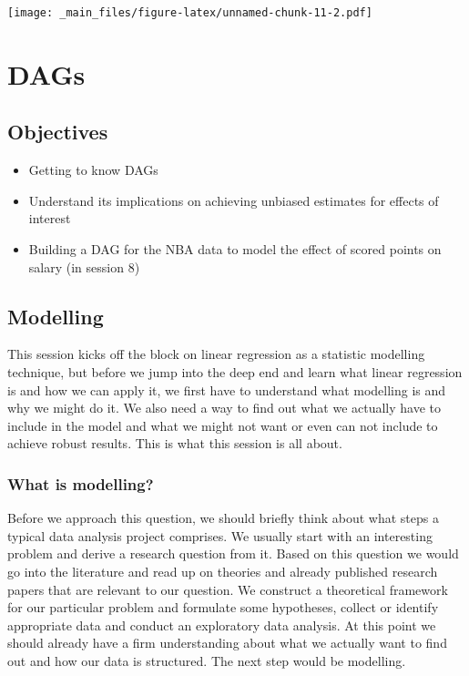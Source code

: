 \documentclass[
]{book}
\providecommand{\tightlist}{%
  \setlength{\itemsep}{0pt}\setlength{\parskip}{0pt}}
\begin{document}
\texttt{[image: \_main\_files/figure-latex/unnamed-chunk-11-2.pdf]}

\hypertarget{dags-1}{%
\chapter{DAGs}\label{dags-1}}

\hypertarget{objectives-2}{%
\section{Objectives}\label{objectives-2}}

\begin{itemize}
\tightlist
\item
  Getting to know DAGs
\item
  Understand its implications on achieving unbiased estimates for effects of interest
\item
  Building a DAG for the NBA data to model the effect of scored points on salary (in session 8)
\end{itemize}

\hypertarget{modelling}{%
\section{Modelling}\label{modelling}}

This session kicks off the block on linear regression as a statistic
modelling technique, but before we jump into the deep end and learn what
linear regression is and how we can apply it, we first have to understand
what modelling is and why we might do it. We also need a way to find out what we
actually have to include in the model and what we might not want or even can not
include to achieve robust results. This is what this session is all about.

\hypertarget{what-is-modelling}{%
\subsection{What is modelling?}\label{what-is-modelling}}

Before we approach this question, we should briefly think about what steps a
typical data analysis project comprises. We usually start with an interesting
problem and derive a research question from it. Based on this question we would
go into the literature and read up on theories and already published research
papers that are relevant to our question. We construct a theoretical framework
for our particular problem and formulate some hypotheses, collect or identify
appropriate data and conduct an exploratory data analysis. At this point we
should already have a firm understanding about what we actually want to find out
and how our data is structured. The next step would be modelling.
\end{document}
